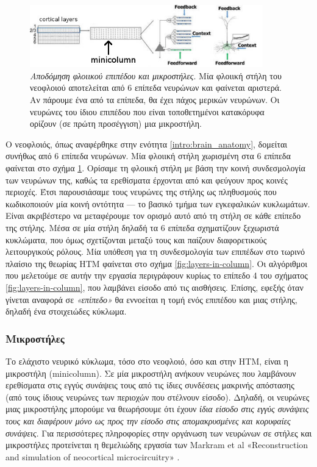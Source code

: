 	\begin{figure}
		\centering
		\includegraphics[width=0.9\textwidth]{figures/layer-minicolumn}
		\caption[αποδόμηση φλοιικού επιπέδου και μικροστήλες]{\textit{Αποδόμηση φλοιικού επιπέδου και μικροστήλες}.
		Μία φλοιική στήλη του νεοφλοιού αποτελείται από 6 επίπεδα νευρώνων και φαίνεται αριστερά.
		Αν πάρουμε ένα από τα επίπεδα, θα έχει πάχος μερικών νευρώνων.
		Οι νευρώνες του ίδιου επιπέδου που είναι τοποθετημένοι κατακόρυφα ορίζουν (σε πρώτη προσέγγιση) μια μικροστήλη.
		\parencite[πηγή][(τροποποιημένο)]{cuiContinuousOnlineSequence2016}
		}
		\label{fig:layer-minicolumn}
	\end{figure}

	Ο νεοφλοιός, όπως αναφέρθηκε στην ενότητα \ref{intro:brain_anatomy}, δομείται συνήθως από 6 επίπεδα νευρώνων.
	Μία φλοιική στήλη χωρισμένη στα 6 επίπεδα φαίνεται στο σχήμα \ref{fig:layer-minicolumn}.
	Ορίσαμε τη φλοιική στήλη με βάση την κοινή συνδεσμολογία των νευρώνων της, καθώς τα ερεθίσματα έρχονται από και φεύγουν προς κοινές περιοχές.
	Έτσι παρουσιάσαμε τους νευρώνες της στήλης ως πληθυσμούς που κωδικοποιούν μία κοινή οντότητα --- το βασικό τμήμα των εγκεφαλικών κυκλωμάτων.
	Είναι ακριβέστερο να μεταφέρουμε τον ορισμό αυτό από τη στήλη σε κάθε επίπεδο της στήλης.
	Μέσα σε μία στήλη δηλαδή τα 6 επίπεδα σχηματίζουν ξεχωριστά κυκλώματα, που όμως σχετίζονται μεταξύ τους και παίζουν διαφορετικούς λειτουργικούς ρόλους.
	Μία υπόθεση για τη συνδεσμολογία των επιπέδων στο τωρινό πλαίσιο της θεωρίας HTM φαίνεται στο σχήμα \ref{fig:layers-in-column}.
  Οι αλγόριθμοι που μελετούμε σε αυτήν την εργασία περιγράφουν κυρίως το επίπεδο 4 του σχήματος \ref{fig:layers-in-column}, που λαμβάνει είσοδο από τις αισθήσεις.
	Επίσης, εφεξής όταν γίνεται αναφορά σε \textit{«επίπεδο»} θα εννοείται η τομή ενός επιπέδου και μιας στήλης, δηλαδή ένα στοιχειώδες κύκλωμα.

	\subsubsection{Μικροστήλες}

	Το ελάχιστο νευρικό κύκλωμα, τόσο στο νεοφλοιό, όσο και στην HTM, είναι η μικροστήλη (minicolumn).
	Σε μία μικροστήλη ανήκουν νευρώνες που λαμβάνουν ερεθίσματα στις εγγύς συνάψεις τους από τις ίδιες συνδέσεις μακρινής απόστασης
	(από τους ίδιους νευρώνες των περιοχών που στέλνουν είσοδο).
	Δηλαδή, οι νευρώνες μιας μικροστήλης μπορούμε να θεωρήσουμε ότι έχουν \textit{ίδια είσοδο στις εγγύς συνάψεις τους
	και διαφέρουν μόνο ως προς την είσοδο στις απομακρυσμένες και κορυφαίες συνάψεις}.
	Για περισσότερες πληροφορίες στην οργάνωση των νευρώνων σε στήλες και μικροστήλες προτείνεται η θεμελιώδης εργασία των Markram et al
	«Reconstruction and simulation of neocortical microcircuitry» \parencite{markramReconstructionSimulationNeocortical2015}.

